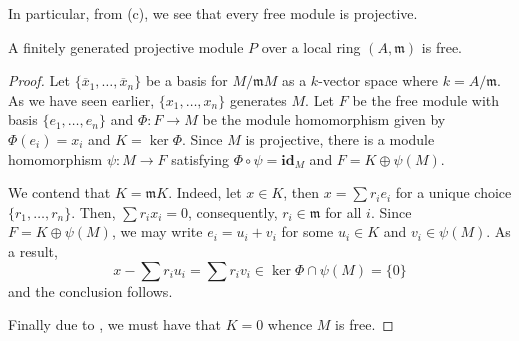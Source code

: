 In particular, from (c), we see that every free module is projective.

\begin{lemma}
    A finitely generated projective module $P$ over a local ring $(A,\mathfrak m)$ is free.
\end{lemma}
\begin{proof}
    Let $\{\overline x_1,\ldots,\overline x_n\}$ be a basis for $M/\mathfrak mM$ as a $k$-vector space where $k = A/\mathfrak m$. As we have seen earlier, $\{x_1,\ldots,x_n\}$ generates $M$. Let $F$ be the free module with basis $\{e_1,\ldots,e_n\}$ and $\Phi: F\to M$ be the module homomorphism given by $\Phi(e_i) = x_i$ and $K = \ker\Phi$. Since $M$ is projective, there is a module homomorphism $\psi: M\to F$ satisfying $\Phi\circ\psi = \mathbf{id}_M$ and $F = K\oplus\psi(M)$.

    We contend that $K = \mathfrak mK$. Indeed, let $x\in K$, then $x = \sum r_ie_i$ for a unique choice $\{r_1,\ldots,r_n\}$. Then, $\sum r_ix_i = 0$, consequently, $r_i\in\mathfrak m$ for all $i$. Since $F = K\oplus\psi(M)$, we may write $e_i = u_i + v_i$ for some $u_i\in K$ and $v_i\in\psi(M)$. As a result, 
    \begin{equation*}
        x - \sum r_iu_i = \sum r_iv_i\in\ker\Phi\cap\psi(M) = \{0\}
    \end{equation*}
    and the conclusion follows.

    Finally due to , we must have that $K = 0$ whence $M$ is free.
\end{proof}